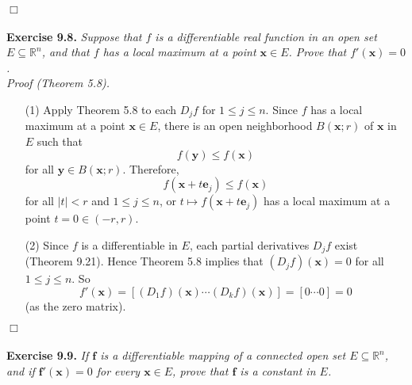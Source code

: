 \documentclass{article}
\begin{document}
$\Box$ \\\\






\textbf{Exercise 9.8.}
\emph{Suppose that $f$ is a differentiable real function in an open set
$E \subseteq \mathbb{R}^n$,
and that $f$ has a local maximum at a point $\mathbf{x} \in E$.
Prove that $f'(\mathbf{x}) = 0$.} \\

\emph{Proof (Theorem 5.8).}
\begin{enumerate}
\item[(1)]
Apply Theorem 5.8 to each $D_j f$ for $1 \leq j \leq n$.
Since $f$ has a local maximum at a point $\mathbf{x} \in E$,
there is an open neighborhood $B(\mathbf{x};r)$ of $\mathbf{x}$ in $E$
such that
\[
  f(\mathbf{y}) \leq f(\mathbf{x})
\]
for all $\mathbf{y} \in B(\mathbf{x};r)$.
Therefore,
\[
  f(\mathbf{x} + t\mathbf{e}_j) \leq f(\mathbf{x})
\]
for all $|t| < r$ and $1 \leq j \leq n$,
or $t \mapsto f(\mathbf{x} + t\mathbf{e}_j)$ has a local maximum at a point
$t = 0 \in (-r,r)$.


\item[(2)]
Since $f$ is a differentiable in $E$, each partial derivatives $D_j f$ exist (Theorem 9.21).
Hence Theorem 5.8 implies that $(D_j f)(\mathbf{x}) = 0$ for all $1 \leq j \leq n$.
So
\[
  f'(\mathbf{x})
  = [ (D_1 f)(\mathbf{x}) \cdots (D_k f)(\mathbf{x}) ]
  = [ 0 \cdots 0 ]
  = 0
\]
(as the zero matrix).
\end{enumerate}
$\Box$ \\\\






\textbf{Exercise 9.9.}
\emph{If $\mathbf{f}$ is a differentiable mapping
of a connected open set $E \subseteq \mathbb{R}^n$,
and if $\mathbf{f}'(\mathbf{x}) = 0$ for every $\mathbf{x} \in E$,
prove that $\mathbf{f}$ is a constant in $E$.} \\
\end{document}
